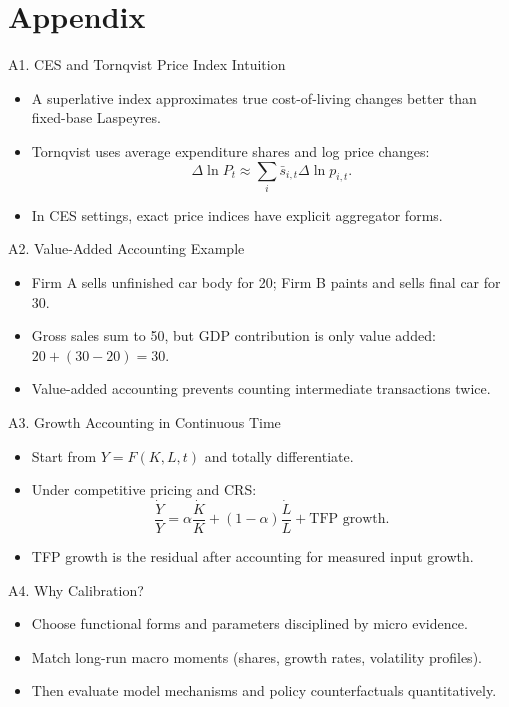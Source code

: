 \documentclass[aspectratio=169,10pt]{beamer}
\newcommand{\backbutton}[1]{\hfill\hyperlink{#1}{\beamerbutton{Back}}}
\begin{document}
\appendix
\section{Appendix}

\begin{frame}{A1. CES and Tornqvist Price Index Intuition}
\hypertarget{apx-cpi}{}
\begin{itemize}
  \item A superlative index approximates true cost-of-living changes better than fixed-base Laspeyres.
  \item Tornqvist uses average expenditure shares and log price changes:
\[
\Delta \ln P_t \approx \sum_i \bar{s}_{i,t} \Delta \ln p_{i,t}.
\]
  \item In CES settings, exact price indices have explicit aggregator forms.
\end{itemize}
\backbutton{main-price}
\end{frame}

\begin{frame}{A2. Value-Added Accounting Example}
\hypertarget{apx-valueadded}{}
\begin{itemize}
  \item Firm A sells unfinished car body for 20; Firm B paints and sells final car for 30.
  \item Gross sales sum to 50, but GDP contribution is only value added: $20 + (30-20)=30$.
  \item Value-added accounting prevents counting intermediate transactions twice.
\end{itemize}
\backbutton{main-gdpid}
\end{frame}

\begin{frame}{A3. Growth Accounting in Continuous Time}
\hypertarget{apx-growthacct}{}
\begin{itemize}
  \item Start from $Y=F(K,L,t)$ and totally differentiate.
  \item Under competitive pricing and CRS:
\[
\frac{\dot Y}{Y}=\alpha\frac{\dot K}{K} + (1-\alpha)\frac{\dot L}{L} + \text{TFP growth}.
\]
  \item TFP growth is the residual after accounting for measured input growth.
\end{itemize}
\backbutton{main-growthacct}
\end{frame}

\begin{frame}{A4. Why Calibration?}
\hypertarget{apx-calib}{}
\begin{itemize}
  \item Choose functional forms and parameters disciplined by micro evidence.
  \item Match long-run macro moments (shares, growth rates, volatility profiles).
  \item Then evaluate model mechanisms and policy counterfactuals quantitatively.
\end{itemize}
\end{frame}
\end{document}
